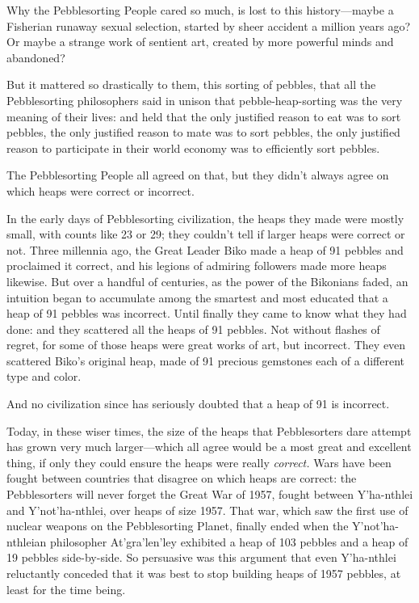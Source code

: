 {
 Why the Pebblesorting People cared so much, is lost to this
history---maybe a Fisherian runaway sexual selection, started by sheer
accident a million years ago? Or maybe a strange work of sentient art,
created by more powerful minds and abandoned?}

{
 But it mattered so drastically to them, this sorting of pebbles,
that all the Pebblesorting philosophers said in unison that
pebble-heap-sorting was the very meaning of their lives: and held that
the only justified reason to eat was to sort pebbles, the only
justified reason to mate was to sort pebbles, the only justified reason
to participate in their world economy was to efficiently sort pebbles.}

{
 The Pebblesorting People all agreed on that, but they
didn't always agree on which heaps were correct or
incorrect.}

{
 In the early days of Pebblesorting civilization, the heaps they
made were mostly small, with counts like 23 or 29; they
couldn't tell if larger heaps were correct or not.
Three millennia ago, the Great Leader Biko made a heap of 91 pebbles
and proclaimed it correct, and his legions of admiring followers made
more heaps likewise. But over a handful of centuries, as the power of
the Bikonians faded, an intuition began to accumulate among the
smartest and most educated that a heap of 91 pebbles was incorrect.
Until finally they came to know what they had done: and they scattered
all the heaps of 91 pebbles. Not without flashes of regret, for some of
those heaps were great works of art, but incorrect. They even scattered
Biko's original heap, made of 91 precious gemstones
each of a different type and color.}

{
 And no civilization since has seriously doubted that a heap of 91
is incorrect.}

{
 Today, in these wiser times, the size of the heaps that
Pebblesorters dare attempt has grown very much larger---which all agree
would be a most great and excellent thing, if only they could ensure
the heaps were really \textit{correct.} Wars have been fought between
countries that disagree on which heaps are correct: the Pebblesorters
will never forget the Great War of 1957, fought between
Y'ha-nthlei and
Y'not'ha-nthlei, over heaps of size
1957. That war, which saw the first use of nuclear weapons on the
Pebblesorting Planet, finally ended when the
Y'not'ha-nthleian philosopher
At'gra'len'ley
exhibited a heap of 103 pebbles and a heap of 19 pebbles side-by-side.
So persuasive was this argument that even Y'ha-nthlei
reluctantly conceded that it was best to stop building heaps of 1957
pebbles, at least for the time being.}

